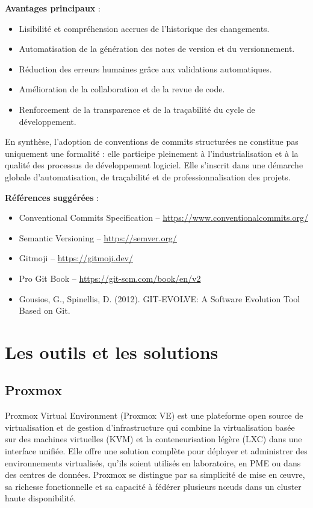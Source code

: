 \textbf{Avantages principaux} :
\begin{itemize}
	\item Lisibilité et compréhension accrues de l’historique des changements.
	\item Automatisation de la génération des notes de version et du versionnement.
	\item Réduction des erreurs humaines grâce aux validations automatiques.
	\item Amélioration de la collaboration et de la revue de code.
	\item Renforcement de la transparence et de la traçabilité du cycle de développement.
\end{itemize}

En synthèse, l’adoption de conventions de commits structurées ne constitue pas uniquement une formalité : elle participe pleinement à l’industrialisation et à la qualité des processus de développement logiciel. Elle s’inscrit dans une démarche globale d’automatisation, de traçabilité et de professionnalisation des projets.

\textbf{Références suggérées} :
\begin{itemize}
	\item Conventional Commits Specification – \url{https://www.conventionalcommits.org/}
	\item Semantic Versioning – \url{https://semver.org/}
	\item Gitmoji – \url{https://gitmoji.dev/}
	\item Pro Git Book – \url{https://git-scm.com/book/en/v2}
	\item Gousios, G., Spinellis, D. (2012). GIT-EVOLVE: A Software Evolution Tool Based on Git.
\end{itemize}

\section{Les outils et les solutions}

\subsection{Proxmox}

Proxmox Virtual Environment (Proxmox VE) est une plateforme open source de virtualisation et de gestion d’infrastructure qui combine la virtualisation basée sur des machines virtuelles (KVM) et la conteneurisation légère (LXC) dans une interface unifiée. Elle offre une solution complète pour déployer et administrer des environnements virtualisés, qu’ils soient utilisés en laboratoire, en PME ou dans des centres de données. Proxmox se distingue par sa simplicité de mise en œuvre, sa richesse fonctionnelle et sa capacité à fédérer plusieurs nœuds dans un cluster haute disponibilité.

